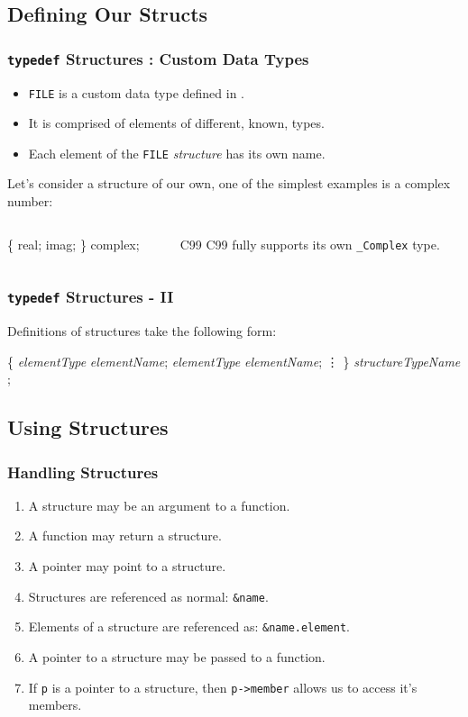 \documentclass[smaller,handout,table]{beamer}
\begin{document}
\subsection{Defining Our Structs}
\begin{frame}[fragile]
\frametitle{{\tt typedef} Structures : Custom Data Types}
\begin{itemize}
\item {\tt FILE} is a custom data type defined in .
\item It is comprised of elements of different, known, types.
\item Each element of the {\tt FILE} \emph{structure} has its own name.
\end{itemize}

Let's consider a structure of our own, one of the simplest examples is a complex number:
\begin{columns}
\begin{column}{5cm}
\begin{semiverbatim}
\{
    real;
    imag;
\} complex;
\end{semiverbatim}
\end{column}
\begin{column}{5cm}
\begin{alertblock}{C99}
C99 fully supports its own {\tt \_Complex}
type.
\end{alertblock}
\end{column}
\end{columns}
\end{frame}

\begin{frame}[fragile]
\frametitle{{\tt typedef} Structures - II}
Definitions of structures take the following form:
\begin{semiverbatim}
   \{
      \emph{elementType} \emph{elementName};
      \emph{elementType} \emph{elementName};
      \vdots
   \} \emph{structureTypeName} ;
\end{semiverbatim}
\end{frame}

\subsection{Using Structures}
\begin{frame}
\frametitle{Handling Structures}
\begin{enumerate}
\item A structure may be an argument to a function.
\item A function may return a structure.
\item A pointer may point to a structure.
\item Structures are referenced as normal: {\tt \&name}.
\item Elements of a structure are referenced as: {\tt \&name.element}.
\item A pointer to a structure may be passed to a function.
\item If {\tt p} is a pointer to a structure, then {\tt p->member} allows us to access it's members.
\end{enumerate}
\end{frame}
\end{document}
